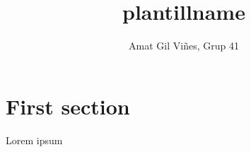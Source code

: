\documentclass{article}
\title{plantillname}
\author{Amat Gil Viñes, Grup 41}
\date{} %
\begin{document}
\maketitle

\section{First section}
Lorem ipsum
\end{document}
